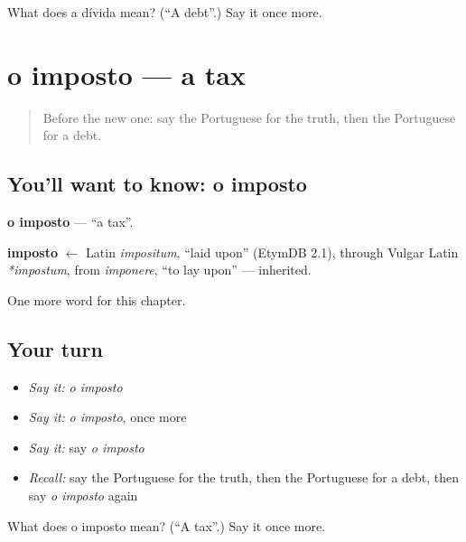 \begin{tcolorbox}[breakable,colback=teal!4,colframe=teal!35!black,title={Before you move on}]
What does a dívida mean? (\textquotedblleft{}A debt\textquotedblright{}.) Say it once more.
\end{tcolorbox}
\section[o imposto]{o imposto — a tax}

\label{lesson:PT-C162-imposto}



\begin{quote}
Before the new one: say the Portuguese for the truth, then the Portuguese for a debt.
\end{quote}

\subsection*{You'll want to know: o imposto}
\textbf{o imposto} — \textquotedblleft{}a tax\textquotedblright{}.

\begin{cousinweb}
\textbf{imposto} $\leftarrow$ Latin \emph{impositum}, \textquotedblleft{}laid upon\textquotedblright{} (EtymDB 2.1), through Vulgar Latin \emph{*impostum}, from \emph{imponere}, \textquotedblleft{}to lay upon\textquotedblright{} — inherited.
\end{cousinweb}

\begin{grammarlens}[title={What you've built}]
One more word for this chapter.
\end{grammarlens}

\subsection*{Your turn}
\begin{itemize}
\raggedright
  \item \emph{Say it:} \emph{o imposto}
  \item \emph{Say it:} \emph{o imposto}, once more
  \item \emph{Say it:} say \emph{o imposto}
  \item \emph{Recall:} say the Portuguese for the truth, then the Portuguese for a debt, then say \emph{o imposto} again
\end{itemize}

\begin{tcolorbox}[breakable,colback=teal!4,colframe=teal!35!black,title={Before you move on}]
What does o imposto mean? (\textquotedblleft{}A tax\textquotedblright{}.) Say it once more.
\end{tcolorbox}
